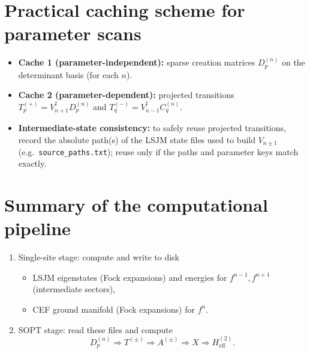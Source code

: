 \documentclass[11pt]{article}
\begin{document}
\section{Practical caching scheme for parameter scans}
\begin{itemize}[leftmargin=2em]
\item \textbf{Cache 1 (parameter-independent):} sparse creation matrices $D_p^{(n)}$ on the determinant basis (for each $n$).
\item \textbf{Cache 2 (parameter-dependent):} projected transitions $T_p^{(+)}=V_{n+1}^\dagger D_p^{(n)}$ and $T_q^{(-)}=V_{n-1}^\dagger C_q^{(n)}$.
\item \textbf{Intermediate-state consistency:} to safely reuse projected transitions, record the absolute path(s) of the LSJM state files used to build $V_{n\pm1}$ (e.g.\ \texttt{source\_paths.txt}); reuse only if the paths and parameter keys match exactly.
\end{itemize}

\section{Summary of the computational pipeline}
\begin{enumerate}[leftmargin=2em]
\item Single-site stage: compute and write to disk
  \begin{itemize}
  \item LSJM eigenstates (Fock expansions) and energies for $f^{n-1}, f^{n+1}$ (intermediate sectors),
  \item CEF ground manifold (Fock expansions) for $f^n$.
  \end{itemize}
\item SOPT stage: read these files and compute
\[
D_p^{(n)} \Rightarrow T^{(\pm)} \Rightarrow A^{(\pm)} \Rightarrow X \Rightarrow H_{\text{eff}}^{(2)}.
\]
\end{enumerate}
\end{document}

